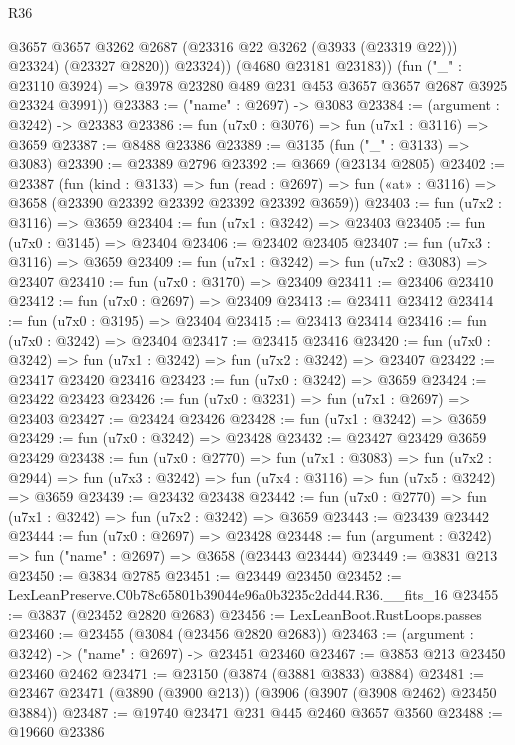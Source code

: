 \begin{lexlean}{R36}
\begin{coremodule}
                @3657
                @3657
                @3262
                @2687
                (@23316 @22 @3262 (@3933 (@23319 @22)))
                @23324)
              (@23327 @2820))
            @23324))
        (@4680 @23181 @23183))
      (fun ("_" : @23110 @3924) =>
      @3978 @23280 @489 @231 @453 @3657 @3657 @2687 @3925 @23324 @3991))
@23383 := ("name" : @2697) -> @3083
@23384 := (argument : @3242) -> @23383
@23386 := fun (u7x0 : @3076) => fun (u7x1 : @3116) => @3659
@23387 := @8488 @23386
@23389 := @3135 (fun ("_" : @3133) => @3083)
@23390 := @23389 @2796
@23392 := @3669 (@23134 @2805)
@23402 := @23387
    (fun (kind : @3133) =>
    fun (read : @2697) => fun («at» : @3116) => @3658 (@23390 @23392 @23392 @23392 @23392 @3659))
@23403 := fun (u7x2 : @3116) => @3659
@23404 := fun (u7x1 : @3242) => @23403
@23405 := fun (u7x0 : @3145) => @23404
@23406 := @23402 @23405
@23407 := fun (u7x3 : @3116) => @3659
@23409 := fun (u7x1 : @3242) => fun (u7x2 : @3083) => @23407
@23410 := fun (u7x0 : @3170) => @23409
@23411 := @23406 @23410
@23412 := fun (u7x0 : @2697) => @23409
@23413 := @23411 @23412
@23414 := fun (u7x0 : @3195) => @23404
@23415 := @23413 @23414
@23416 := fun (u7x0 : @3242) => @23404
@23417 := @23415 @23416
@23420 := fun (u7x0 : @3242) => fun (u7x1 : @3242) => fun (u7x2 : @3242) => @23407
@23422 := @23417 @23420 @23416
@23423 := fun (u7x0 : @3242) => @3659
@23424 := @23422 @23423
@23426 := fun (u7x0 : @3231) => fun (u7x1 : @2697) => @23403
@23427 := @23424 @23426
@23428 := fun (u7x1 : @3242) => @3659
@23429 := fun (u7x0 : @3242) => @23428
@23432 := @23427 @23429 @3659 @23429
@23438 := fun (u7x0 : @2770) =>
  fun (u7x1 : @3083) =>
  fun (u7x2 : @2944) => fun (u7x3 : @3242) => fun (u7x4 : @3116) => fun (u7x5 : @3242) => @3659
@23439 := @23432 @23438
@23442 := fun (u7x0 : @2770) => fun (u7x1 : @3242) => fun (u7x2 : @3242) => @3659
@23443 := @23439 @23442
@23444 := fun (u7x0 : @2697) => @23428
@23448 := fun (argument : @3242) => fun ("name" : @2697) => @3658 (@23443 @23444)
@23449 := @3831 @213
@23450 := @3834 @2785
@23451 := @23449 @23450
@23452 := LexLeanPreserve.C0b78c65801b39044e96a0b3235c2dd44.R36.__fits_16
@23455 := @3837 (@23452 @2820 @2683)
@23456 := LexLeanBoot.RustLoops.passes
@23460 := @23455 (@3084 (@23456 @2820 @2683))
@23463 := (argument : @3242) -> ("name" : @2697) -> @23451 @23460
@23467 := @3853 @213 @23450 @23460 @2462
@23471 := @23150 (@3874 (@3881 @3833) @3884)
@23481 := @23467 @23471 (@3890 (@3900 @213)) (@3906 (@3907 (@3908 @2462) @23450 @3884))
@23487 := @19740 @23471 @231 @445 @2460 @3657 @3560
@23488 := @19660 @23386

\end{coremodule}
\end{lexlean}
